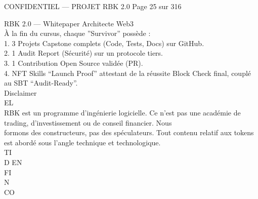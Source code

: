 \documentclass[12pt,landscape,a4paper]{article}
\newenvironment{confidential}
{\begin{tcolorbox}[
    colback=rbkred!5!white,
    colframe=rbkred!75!black,
    title=CONFIDENTIEL,
    fonttitle=\bfseries\color{white},
    coltitle=rbkred!75!black,
    breakable,
    enhanced,
    frame hidden,
    borderline west={2pt}{0pt}{rbkred!75!black}
]}
{\end{tcolorbox}}
\begin{document}
\vspace{0.5em}
\vspace{0.5em}
\vspace{0.5em}
\vspace{0.5em}
\begin{confidential}CONFIDENTIEL — PROJET RBK 2.0                                            Page 25 sur 316\end{confidential}
RBK 2.0 — Whitepaper Architecte Web3\\
\vspace{0.5em}
\vspace{0.5em}
\vspace{0.5em}
À la fin du cursus, chaque ”Survivor” possède :\\
\vspace{0.5em}
1. 3 Projets Capstone complets (Code, Tests, Docs) sur GitHub.\\
\vspace{0.5em}
2. 1 Audit Report (Sécurité) sur un protocole tiers.\\
\vspace{0.5em}
3. 1 Contribution Open Source validée (PR).\\
\vspace{0.5em}
4. NFT Skills “Launch Proof” attestant de la réussite Block Check final, couplé au SBT “Audit-Ready”.\\
\vspace{0.5em}
Disclaimer\\
\vspace{0.5em}
\vspace{0.5em}
\vspace{0.5em}
\vspace{0.5em}
EL\\
RBK est un programme d’ingénierie logicielle. Ce n’est pas une académie de trading, d’investissement ou de conseil financier. Nous\\
formons des constructeurs, pas des spéculateurs. Tout contenu relatif aux tokens est abordé sous l’angle technique et technologique.\\
\vspace{0.5em}
\vspace{0.5em}
\vspace{0.5em}
\vspace{0.5em}
TI\\
D   EN\\
FI\\
N\\
CO\\
\vspace{0.5em}
\end{document}
